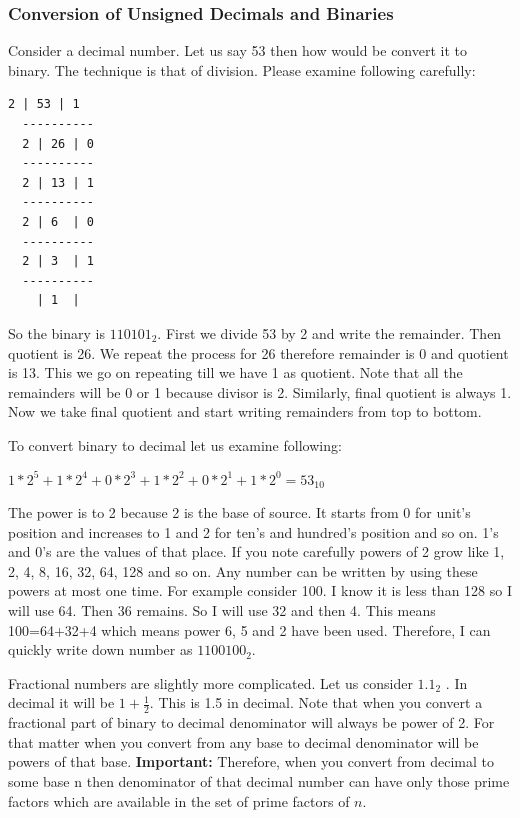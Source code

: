 \subsubsection{Conversion of Unsigned Decimals and Binaries}
Consider a decimal number. Let us say 53 then how would be convert it to
binary. The technique is that of division. Please examine following carefully:

\hspace*{2cm}
\begin{Verbatim}[frame=single]
  2 | 53 | 1
  ----------
  2 | 26 | 0
  ----------
  2 | 13 | 1
  ----------
  2 | 6  | 0
  ----------
  2 | 3  | 1
  ----------
    | 1  |
\end{Verbatim}

So the binary is $110101_2$. First we divide 53 by 2 and write the
remainder. Then quotient is 26. We repeat the process for 26 therefore
remainder is 0 and quotient is 13. This we go on repeating till we have 1 as
quotient. Note that all the remainders will be 0 or 1 because divisor is
2. Similarly, final quotient is always 1. Now we take final quotient and start
writing remainders from top to bottom.

To convert binary to decimal let us examine following:

$1*2^5 +1*2^4 +0*2^3 +1*2^2 +0*2^1 +1*2^0 =53_{10}$

The power is to 2 because 2 is the base of source. It starts from 0 for unit's
position and increases to 1 and 2 for ten's and hundred's position and so
on. 1's and 0's are the values of that place. If you note carefully powers of 2
grow like 1, 2, 4, 8, 16, 32, 64, 128 and so on. Any number can be written by
using these powers at most one time. For example consider 100. I know it is
less than 128 so I will use 64. Then 36 remains. So I will use 32 and then
4. This means 100=64+32+4  which means power 6, 5 and 2 have been
used. Therefore, I can quickly write down number as $1100100_2$.

\label{fractional binary numbers}
Fractional numbers are slightly more complicated. Let us consider $1.1_2$  . In
decimal it will be $1+\frac{1}{2}$. This is 1.5 in decimal. Note that when you
convert a fractional part of binary to decimal denominator will always be power
of 2. For that matter when you convert from any base to decimal denominator
will be powers of that base. \textbf{Important:} Therefore, when you convert
from decimal to some base n then denominator of that decimal number can have
only those prime factors which are available in the set of prime factors of
$n$.

